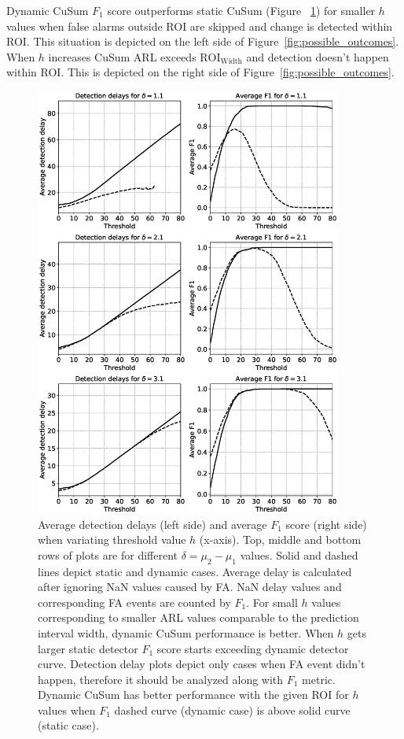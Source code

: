 Dynamic CuSum $F_1$ score outperforms static CuSum (Figure ~\ref{fig:artificial_signal_perf_results}) for smaller $h$ values when false alarms outside ROI are skipped and change is detected within ROI. 
This situation is depicted on the left side of Figure~\ref{fig:possible_outcomes}.
When $h$ increases CuSum ARL exceeds $\text{ROI}_{\text{Width}}$ and detection doesn't happen within ROI.
This is depicted on the right side of Figure~\ref{fig:possible_outcomes}. 
\begin{figure}[!htb]
	\centering
	\includegraphics[width=0.90\textwidth]{articles/pics/journal_paper/performance_detection_sim}
	\caption{Average detection delays (left side) and average $F_1$ score (right side) when variating threshold value $h$ (x-axis).
	Top, middle and bottom rows of plots are for different $\delta = \mu_2 - \mu_1$ values.
	Solid and dashed lines depict static and dynamic cases.
    Average delay is calculated after ignoring NaN values caused by FA.
    NaN delay values and corresponding FA events are counted by $F_1$.
    For small $h$ values corresponding to smaller ARL values comparable to the prediction interval width, dynamic CuSum performance is better.
    When $h$ gets larger static detector $F_1$ score starts exceeding dynamic detector curve.
    Detection delay plots depict only cases when FA event didn't happen, therefore it should be analyzed along with $F_1$ metric.
    Dynamic CuSum has better performance with the given ROI for $h$ values when $F_1$ dashed curve (dynamic case) is above solid curve (static case).
	}
	\label{fig:artificial_signal_perf_results}
\end{figure}


